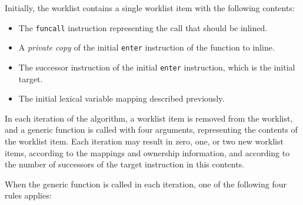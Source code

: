 Initially, the worklist contains a single worklist item with the
following contents:

\begin{itemize}
\item The \texttt{funcall} instruction representing the call that
  should be inlined.
\item A \emph{private copy} of the initial \texttt{enter} instruction
  of the function to inline.
\item The successor instruction of the initial \texttt{enter}
  instruction, which is the initial target.
\item The initial lexical variable mapping described previously.
\end{itemize}

In each iteration of the algorithm, a worklist item is removed from
the worklist, and a generic function is called with four arguments,
representing the contents of the worklist item.  Each iteration may
result in zero, one, or two new worklist items, according to the
mappings and ownership information, and according to the number of
successors of the target instruction in this contents.

When the generic function is called in each iteration, one of the
following four rules applies:

